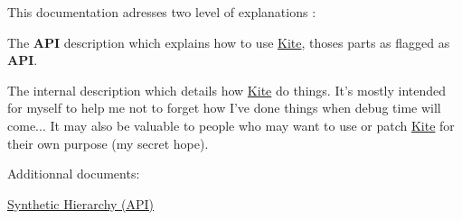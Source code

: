 This documentation adresses two level of explanations \-:


\begin{DoxyItemize}
\item The {\bfseries A\-P\-I} description which explains how to use \hyperlink{namespaceKite}{Kite}, thoses parts as flagged as {\bfseries A\-P\-I}. 
\item The internal description which details how \hyperlink{namespaceKite}{Kite} do things. It's mostly intended for myself to help me not to forget how I've done things when debug time will come... It may also be valuable to people who may want to use or patch \hyperlink{namespaceKite}{Kite} for their own purpose (my secret hope). 
\end{DoxyItemize}

Additionnal documents\-:
\begin{DoxyItemize}
\item \hyperlink{group__grpSynthHierarchy}{Synthetic Hierarchy (A\-P\-I)} 
\end{DoxyItemize}
